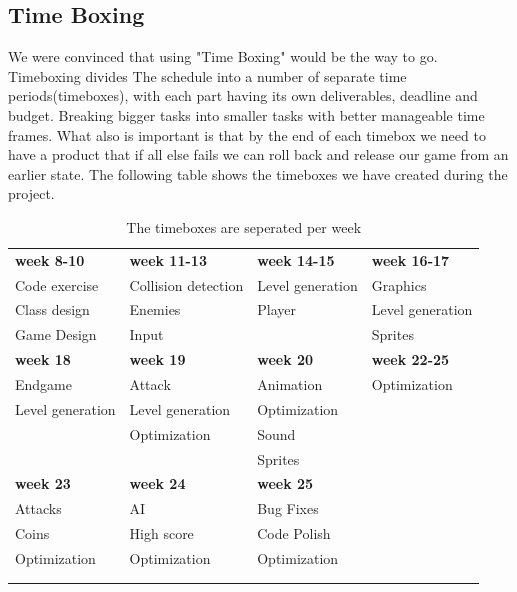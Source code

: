 \subsection*{Time Boxing} %
We were convinced that using "Time Boxing" would be the way to go. Timeboxing divides The schedule into a number of separate time periods(timeboxes), with each part having its own deliverables, deadline and budget. Breaking bigger tasks into smaller tasks with better manageable time frames. What also is important is that by the end of each timebox we need to have a product that if all else fails we can roll back and release our game from an earlier state. The following table shows the timeboxes we have created during the project.
\begin{table}[h]
\begin{tabular}{llll}
  \rowcolor[HTML]{BBDAFF}
  \textbf{week 8-10}	& \textbf{week 11-13}	& \textbf{week 14-15}	& \textbf{week 16-17}	\\
  Code exercise			& Collision detection	& Level generation		& Graphics				\\
  Class design			& Enemies				& Player				& Level generation		\\
  Game Design			& Input					& 						& Sprites				\\
  \rowcolor[HTML]{BBDAFF} 
  \textbf{week 18}		& \textbf{week 19}		& \textbf{week 20}		& \textbf{week 22-25}	\\
  Endgame				& Attack				& Animation				& Optimization			\\
  Level generation		& Level generation		& Optimization			& 						\\
  						& Optimization			& Sound					& 						\\
  						& 						& Sprites 				& 						\\
  \textbf{week 23}		& \textbf{week 24}		& \textbf{week 25}		& 						\\
  Attacks				& AI					& Bug Fixes				& 						\\
  Coins					& High score			& Code Polish			& 						\\
  Optimization			& Optimization			& Optimization			& 						\\
  						& 						& 						& 						\\
  						& 						& 						& 						\\
\end{tabular}
\caption{The timeboxes are seperated per week}
\end{table}
\newpage

